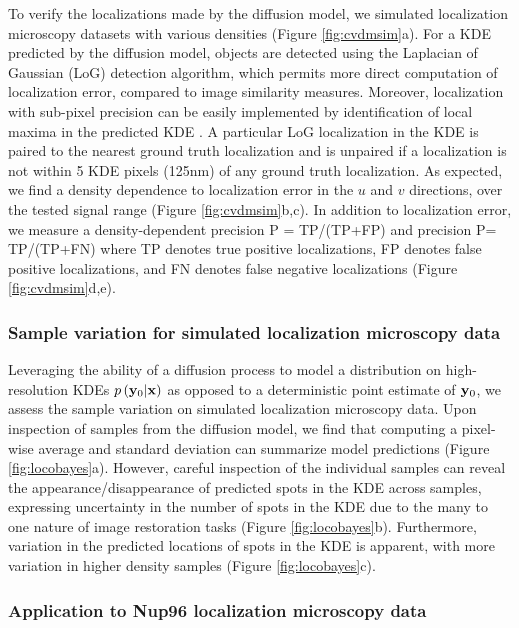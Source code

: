 To verify the localizations made by the diffusion model, we simulated localization microscopy datasets with various densities (Figure \ref{fig:cvdmsim}a). For a KDE predicted by the diffusion model, objects are detected using the Laplacian of Gaussian (LoG) detection algorithm, which permits more direct computation of localization error, compared to image similarity measures. Moreover, localization with sub-pixel precision can be easily implemented by identification of local maxima in the predicted KDE \parencite{Nehme2020}. A particular LoG localization in the KDE is paired to the nearest ground truth localization and is unpaired if a localization is not within 5 KDE pixels (125nm) of any ground truth localization. As expected, we find a density dependence to localization error in the $u$ and $v$ directions, over the tested signal range (Figure \ref{fig:cvdmsim}b,c). In addition to localization error, we measure a density-dependent precision P = TP/(TP+FP) and precision P= TP/(TP+FN) where TP denotes true positive localizations, FP denotes false positive localizations, and FN denotes false negative localizations (Figure \ref{fig:cvdmsim}d,e). 

\subsubsection{Sample variation for simulated localization microscopy data}

Leveraging the ability of a diffusion process to model a distribution on high-resolution KDEs $p\left(\bold{y}_0\lvert \bold{x}\right)$ as opposed to a deterministic point estimate of $\bold{y}_0$, we assess the sample variation on simulated localization microscopy data. Upon inspection of samples from the diffusion model, we find that computing a pixel-wise average and standard deviation can summarize model predictions (Figure \ref{fig:locobayes}a). However, careful inspection of the individual samples can reveal the appearance/disappearance of predicted spots in the KDE across samples, expressing uncertainty in the number of spots in the KDE due to the many to one nature of image restoration tasks (Figure \ref{fig:locobayes}b). Furthermore, variation in the predicted locations of spots in the KDE is apparent, with more variation in higher density samples (Figure \ref{fig:locobayes}c). 

\subsubsection{Application to Nup96 localization microscopy data}

